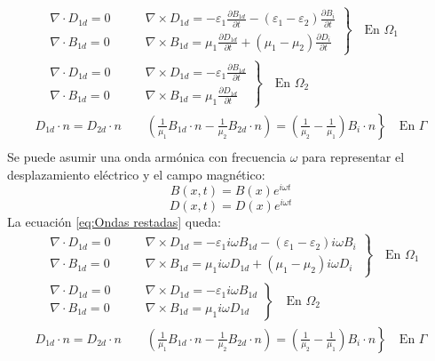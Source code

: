 \documentclass[11pt]{article}
\begin{document}
\begin{equation}
\label{eq:Ondas restadas}
\begin{split}
\left.
\begin{aligned}
&\nabla\cdot D_{1d}= 0\qquad & \nabla\times D_{1d}= -\varepsilon_1\frac{\partial B_{1d}}{\partial t}-(\varepsilon_1-\varepsilon	_2)\frac{\partial B_i}{\partial t}\\
&\nabla\cdot B_{1d} = 0\qquad &  \nabla\times B_{1d}= \mu_1\frac{\partial D_{1d}}{\partial t}+(\mu_1-\mu_2)\frac{\partial D_i}{\partial t}
\end{aligned}
\right\}
\quad\text{En }\Omega_1\\
\left.
\begin{aligned}
&\nabla\cdot D_{1d}= 0\qquad & \nabla\times D_{1d}= -\varepsilon_1\frac{\partial B_{1d}}{\partial t}\\
&\nabla\cdot B_{1d} = 0\qquad &  \nabla\times B_{1d}= \mu_1\frac{\partial D_{1d}}{\partial t}
\end{aligned}
\right\}
\quad\text{En }\Omega_2\\
\left. 
D_{1d}\cdot n=D_{2d}\cdot n \qquad \left(\frac{1}{\mu_1}B_{1d}\cdot n-\frac{1}{\mu_2}B_{2d}\cdot n\right)=\left(\frac{1}{\mu_2}-\frac{1}{\mu_1}\right)B_i\cdot n
\right\}
\quad\text{En }\Gamma\\
\end{split}
\end{equation}
Se puede asumir una onda armónica con frecuencia $\omega$ para representar el desplazamiento eléctrico y el campo magnético:
$$B(x,t)=B(x)e^{i\omega t}$$
$$D(x,t)=D(x)e^{i\omega t}$$
La ecuación \eqref{eq:Ondas restadas} queda:
\begin{equation}
\label{eq:Ondas armonicas restadas }
\begin{split}
\left.
\begin{aligned}
&\nabla\cdot D_{1d}= 0\qquad & \nabla\times D_{1d}= -\varepsilon_1i\omega B_{1d}-(\varepsilon_1-\varepsilon	_2) i\omega B_i\\
&\nabla\cdot B_{1d} = 0\qquad &  \nabla\times B_{1d}= \mu_1 i\omega D_{1d}+(\mu_1-\mu_2)i\omega D_i
\end{aligned}
\right\}
\quad\text{En }\Omega_1\\
\left.
\begin{aligned}
&\nabla\cdot D_{1d}= 0\qquad & \nabla\times D_{1d}= -\varepsilon_1 i\omega B_{1d}\\
&\nabla\cdot B_{1d} = 0\qquad &  \nabla\times B_{1d}= \mu_1 i\omega D_{1d}
\end{aligned}
\right\}
\quad\text{En }\Omega_2\\
\left. 
D_{1d}\cdot n=D_{2d}\cdot n \qquad \left(\frac{1}{\mu_1}B_{1d}\cdot n-\frac{1}{\mu_2}B_{2d}\cdot n\right)=\left(\frac{1}{\mu_2}-\frac{1}{\mu_1}\right)B_i\cdot n
\right\}
\quad\text{En }\Gamma\\
\end{split}
\end{equation}
\end{document}
